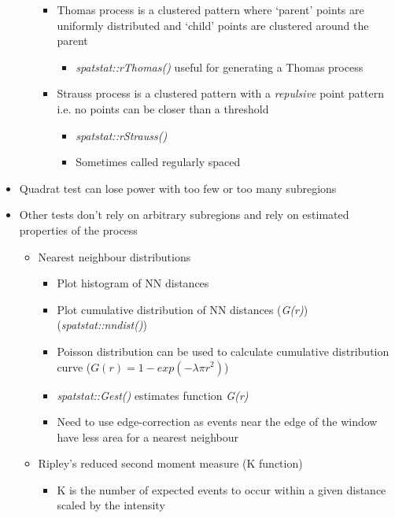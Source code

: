 \documentclass{article}
\begin{document}
\begin{itemize}
\begin{enumerate}
\begin{itemize}
            \item Thomas process is a clustered pattern where `parent' points are uniformly distributed and `child' points are clustered around the parent
            \begin{itemize}
                \item \textit{spatstat::rThomas()} useful for generating a Thomas process
            \end{itemize}
            \item Strauss process is a clustered pattern with a \textit{repulsive} point pattern i.e. no points can be closer than a threshold
            \begin{itemize}
                \item \textit{spatstat::rStrauss()}
                \item Sometimes called regularly spaced
            \end{itemize}
        \end{itemize}
    \end{enumerate}
    \item Quadrat test can lose power with too few or too many subregions
    \item Other tests don't rely on arbitrary subregions and rely on estimated properties of the process
    \begin{itemize}
        \item Nearest neighbour distributions
        \begin{itemize}
            \item Plot histogram of NN distances
            \item Plot cumulative distribution of NN distances (\textit{G(r)}) (\textit{spatstat::nndist()})
            \item Poisson distribution can be used to calculate cumulative distribution curve ($G(r) = 1 - exp( - \lambda \pi r^2)$)
            \item \textit{spatstat::Gest()} estimates function \textit{G(r)}
            \item Need to use edge-correction as events near the edge of the window have less area for a nearest neighbour
        \end{itemize}
        \item Ripley's reduced second moment measure (K function)
        \begin{itemize}
            \item K is the number of expected events to occur within a given distance scaled by the intensity

\end{itemize}
\end{itemize}
\end{itemize}
\end{document}
